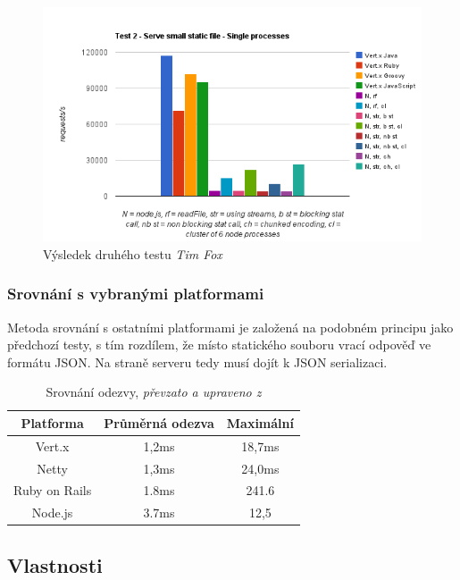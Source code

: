 \begin{figure}[h]
\begin{centering}
\includegraphics[scale=0.7]{obrazky/chart_3-5}
\par\end{centering}
\caption{Výsledek druhého testu \emph{Tim Fox} \cite{benchmarkTim}\label{fig:test2}}
\end{figure}

\newpage

\subsubsection{Srovnání s vybranými platformami}

Metoda srovnání s ostatními platformami je založená na podobném principu jako předchozí testy, s tím rozdílem, že místo statického souboru vrací odpověď ve formátu JSON. Na straně serveru tedy musí dojít k JSON serializaci.

\begin{table}[h]
\centering
\caption{Srovnání odezvy, \emph{převzato a upraveno z} \cite{benchmark}}
\begin{tabular}{ |c|c|c| }
\hline
\textsf{\textbf{Platforma}} & \textsf{\textbf{Průměrná odezva}} & \textsf{\textbf{Maximální}}\tabularnewline
\hline
Vert.x & 1,2ms & 18,7ms\tabularnewline
\hline 
Netty & 1,3ms & 24,0ms\tabularnewline
\hline
Ruby on Rails & 1.8ms & 241.6\tabularnewline
\hline 
Node.js & 3.7ms & 12,5\tabularnewline
\hline
\end{tabular}
\label{table:odezvy}
\end{table}

\newpage

\subsection{Vlastnosti}


